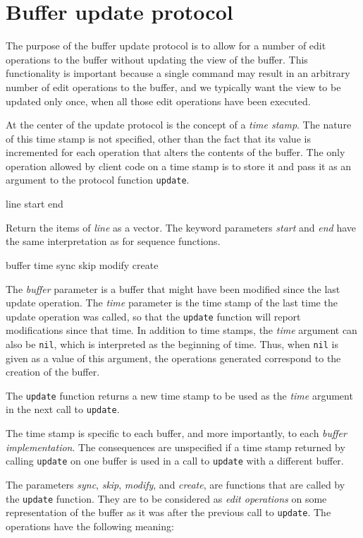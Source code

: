 \section{Buffer update protocol}
\label{sec-update-protocol}

The purpose of the buffer update protocol is to allow for a number of
edit operations to the buffer without updating the view of the buffer.
This functionality is important because a single command may result in
an arbitrary number of edit operations to the buffer, and we typically
want the view to be updated only once, when all those edit operations
have been executed.

At the center of the update protocol is the concept of a \emph{time
  stamp}.  The nature of this time stamp is not specified, other than
the fact that its value is incremented for each operation that alters
the contents of the buffer.  The only operation allowed by client code
on a time stamp is to store it and pass it as an argument to the
protocol function \texttt{update}.

 {line \key start end}

Return the items of \textit{line} as a vector.  The keyword parameters
\textit{start} and \textit{end} have the same interpretation as for
\commonlisp{} sequence functions.

 {buffer time sync skip modify create}

The \textit{buffer} parameter is a buffer that might have been
modified since the last update operation.  The \textit{time} parameter
is the time stamp of the last time the update operation was called, so
that the \texttt{update} function will report modifications since that
time.  In addition to time stamps, the \textit{time} argument can also
be \texttt{nil}, which is interpreted as the beginning of time.  Thus,
when \texttt{nil} is given as a value of this argument, the operations
generated correspond to the creation of the buffer.

The \texttt{update} function returns a new time stamp to be used as
the \textit{time} argument in the next call to \texttt{update}.

The time stamp is specific to each buffer, and more importantly, to
each \emph{buffer implementation}.  The consequences are unspecified
if a time stamp returned by calling \texttt{update} on one buffer is
used in a call to \texttt{update} with a different buffer.

The parameters \textit{sync}, \textit{skip}, \textit{modify}, and
\textit{create}, are functions that are called by the \texttt{update}
function.  They are to be considered as \emph{edit operations} on some
representation of the buffer as it was after the previous call to
\texttt{update}.  The operations have the following meaning:

